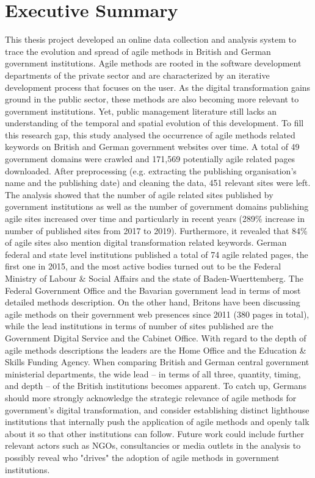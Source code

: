 

\section*{Executive Summary}


This thesis project developed an online data collection and analysis system to trace the evolution and spread of agile methods in British and German government institutions. Agile methods are rooted in the software development departments of the private sector and are characterized by an iterative development process that focuses on the user. As the digital transformation gains ground in the public sector, these methods are also becoming more relevant to government institutions. Yet, public management literature still lacks an understanding of the temporal and spatial evolution of this development. To fill this research gap, this study analysed the occurrence of agile methods related keywords on British and German government websites over time. A total of 49 government domains were crawled and 171,569 potentially agile related pages downloaded. After preprocessing (e.g. extracting the publishing organisation's name and the publishing date) and cleaning the data, 451 relevant sites were left. The analysis showed that the number of agile related sites published by government institutions as well as the number of government domains publishing agile sites increased over time and particularly in recent years (289\% increase in number of published sites from 2017 to 2019). Furthermore, it revealed that 84\% of agile sites also mention digital transformation related keywords. German federal and state level institutions published a total of 74 agile related pages, the first one in 2015, and the most active bodies turned out to be the Federal Ministry of Labour \& Social Affairs and the state of Baden-Wuerttemberg. The Federal Government Office and the Bavarian government lead in terms of most detailed methods description. On the other hand, Britons have been discussing agile methods on their government web presences since 2011 (380 pages in total), while the lead institutions in terms of number of sites published are the Government Digital Service and the Cabinet Office. With regard to the depth of agile methods descriptions the leaders are the Home Office and the Education \& Skills Funding Agency. When comparing British and German central government ministerial departments, the wide lead – in terms of all three, quantity, timing, and depth – of the British institutions becomes apparent. To catch up, Germans should more strongly acknowledge the strategic relevance of agile methods for government's digital transformation, and consider establishing distinct lighthouse institutions that internally push the application of agile methods and openly talk about it so that other institutions can follow. Future work could include further relevant actors such as NGOs, consultancies or media outlets in the analysis to possibly reveal who "drives" the adoption of agile methods in government institutions.